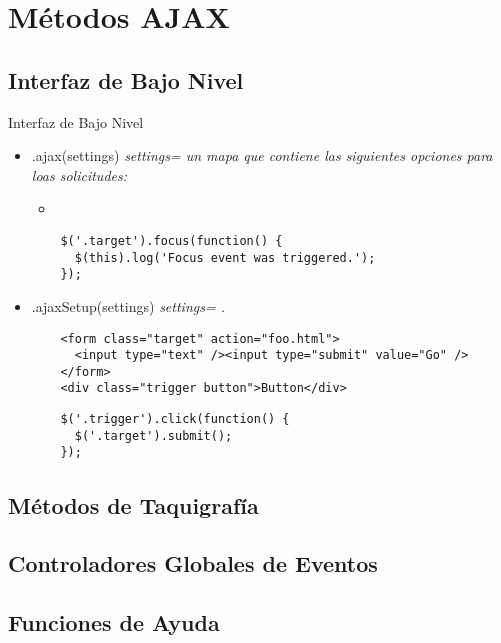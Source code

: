 \section{Métodos AJAX} %

\subsection{Interfaz de Bajo Nivel} %

\begin{frame}[fragile]{Interfaz de Bajo Nivel} %
\begin{itemize}
    \item .ajax(settings) \textit{ settings= un mapa que contiene las siguientes opciones para loas solicitudes:}
    \begin{itemize}
      \item
    \end{itemize}
    \begin{lstlisting}
    $('.target').focus(function() {
      $(this).log('Focus event was triggered.');
    });
    \end{lstlisting}
    \item .ajaxSetup(settings) \textit{ settings= .} 
    \begin{lstlisting}
    <form class="target" action="foo.html">
      <input type="text" /><input type="submit" value="Go" />
    </form>
    <div class="trigger button">Button</div>
    \end{lstlisting}
    \begin{lstlisting}
    $('.trigger').click(function() {
      $('.target').submit();
    });
    \end{lstlisting}
\end{itemize}
\end{frame}

\subsection{Métodos de Taquigrafía} %

\subsection{Controladores Globales de Eventos} %

\subsection{Funciones de Ayuda} %


